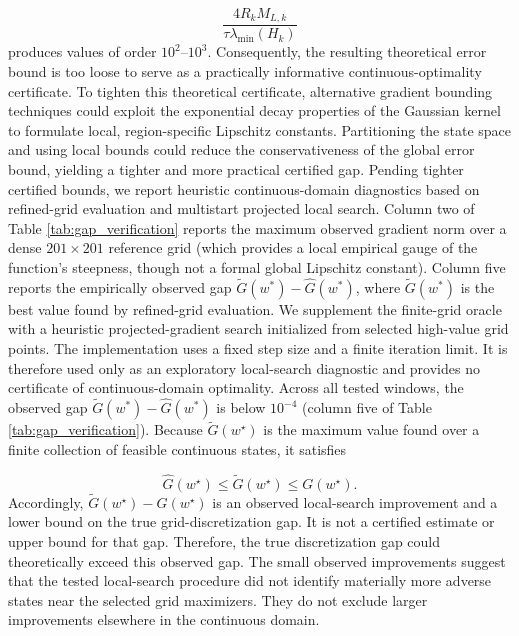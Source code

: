 \documentclass[smallextended]{svjour3}
\begin{document}
\[
\frac{4R_kM_{L,k}}
{\tau\lambda_{\min}(H_k)}
\]
produces values of order $10^2$--$10^3$. Consequently, the resulting
theoretical error bound is too loose to serve as a practically informative
continuous-optimality certificate. To tighten this theoretical certificate, alternative gradient bounding techniques could exploit the exponential decay properties of the Gaussian kernel to formulate local, region-specific Lipschitz constants. Partitioning the state space and using local bounds could reduce the conservativeness of the global error bound, yielding a tighter and more practical certified gap. Pending tighter certified bounds, we report heuristic continuous-domain
diagnostics based on refined-grid evaluation and multistart projected local
search. Column two of Table \ref{tab:gap_verification} reports the maximum observed gradient norm over a dense $201\times201$ reference grid (which provides a local empirical gauge of the function's steepness, though not a formal global Lipschitz constant). Column five reports the empirically observed gap $\widetilde G(w^*) - \widehat G(w^*)$, where $\widetilde G(w^*)$ is the best value found by refined-grid evaluation. We supplement the finite-grid oracle with a heuristic projected-gradient search initialized from selected high-value grid points. The implementation uses a fixed step size and a finite iteration limit. It is therefore used only as an exploratory local-search diagnostic and provides no certificate of continuous-domain optimality. Across all tested windows, the observed gap $\widetilde G(w^*) - \widehat G(w^*)$ is below $10^{-4}$ (column five of Table \ref{tab:gap_verification}). Because $\widetilde G(w^\star)$ is the maximum value found over a finite
collection of feasible continuous states, it satisfies

\[
\widehat G(w^\star)
\le
\widetilde G(w^\star)
\le
G(w^\star).
\]
Accordingly,
$\widetilde G(w^\star)-\widehat G(w^\star)$ is an observed local-search
improvement and a lower bound on the true grid-discretization gap. It is not
a certified estimate or upper bound for that gap. Therefore, the true discretization gap could theoretically exceed this observed gap. The small observed improvements suggest that the tested local-search
procedure did not identify materially more adverse states near the selected
grid maximizers. They do not exclude larger improvements elsewhere in the
continuous domain.
\end{document}
